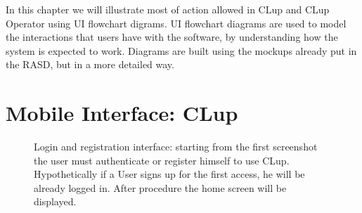 In this chapter we will illustrate most of action allowed in CLup and CLup Operator using UI flowchart digrams. UI flowchart diagrams are used to model the interactions that users have with the software, by understanding how the system is expected to work. Diagrams are built using the mockups already put in the RASD, but in a more detailed way.

\section{Mobile Interface: CLup}

\begin{figure}[H]
  \label{login_rec}
  \centering
    \caption{Login and registration interface: starting from the first screenshot the user must authenticate or register himself to use CLup. Hypothetically if a User signs up for the first access, he will be already logged in. After procedure the home screen will be displayed.}
\end{figure}



